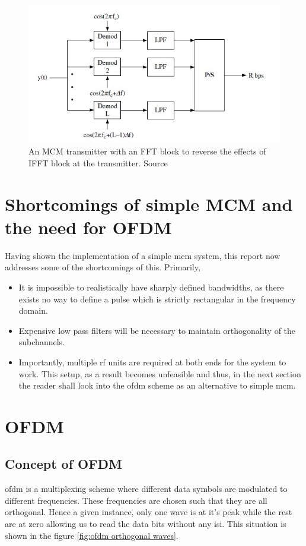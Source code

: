 \begin{figure}[!htbp]
\centering
\includegraphics[scale=1]{Chapter 2/Figures/MCM Receiver}
\caption[MCM Receiver]{An MCM transmitter with an FFT block to reverse the effects of IFFT block at the transmitter. Source \textcite{Ghosh2010}}
\label{fig:mcm receiver}
\end{figure}




\section{Shortcomings of simple MCM and the need for OFDM}
Having shown the implementation of a simple \acrshort{mcm} system, this report now addresses some of the shortcomings of this. Primarily,
\begin{itemize}
\item It is impossible to realistically have sharply defined bandwidths, as there exists no way to define a pulse which is strictly rectangular in the frequency domain.
\item Expensive low pass filters will be necessary to maintain orthogonality of the subchannels.
\item Importantly, multiple \acrshort{rf} units are required at both ends for the system to work. This setup, as a result becomes unfeasible and thus, in the next section the reader shall look into the \acrshort{ofdm} scheme as an alternative to simple \acrshort{mcm}.
\end{itemize}

\section{OFDM}
\subsection{Concept of OFDM}
\acrlong{ofdm} is a multiplexing scheme where different data symbols are modulated to different frequencies. These frequencies are chosen such that they are all orthogonal. Hence a given instance, only one wave is at it's peak while the rest are at zero allowing us to read the data bits without any \acrlong{isi}. This situation is shown in the figure \ref{fig:ofdm orthogonal waves}.\\

